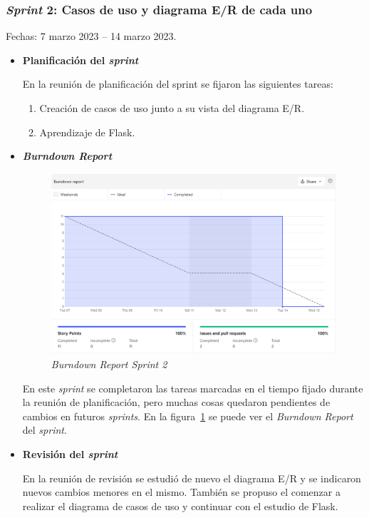 \subsubsection{\textit{Sprint} 2: Casos de uso y diagrama E/R de cada uno}
Fechas: 7 marzo 2023 -- 14 marzo 2023.
\begin{itemize}
\item\textbf{Planificación del \textit{sprint}}

En la reunión de planificación del sprint se fijaron las siguientes tareas:
\begin{enumerate}
	\item Creación de casos de uso junto a su vista del diagrama E/R.
	\item Aprendizaje de Flask.
\end{enumerate}

\item\textbf{\textit{Burndown Report}}

\begin{figure}
	\centering
	\includegraphics[width=\textwidth]{../img/Anexos/Sprints/Sprint2.png}
	\caption{\textit{Burndown Report Sprint 2}}\label{ReportSprint2}
\end{figure}

En este \textit{sprint} se completaron las tareas marcadas en el tiempo fijado durante la reunión de planificación, pero muchas cosas quedaron pendientes de cambios en futuros \textit{sprints}. En la figura~\ref{ReportSprint2} se puede ver el \textit{Burndown Report} del \textit{sprint}.

\item\textbf{Revisión del \textit{sprint}}

En la reunión de revisión se estudió de nuevo el diagrama E/R y se indicaron nuevos cambios menores en el mismo. También se propuso el comenzar a realizar el diagrama de casos de uso y continuar con el estudio de Flask.
\end{itemize}

